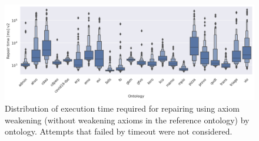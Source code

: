 \begin{figure}[ht]
  \centering
  \includegraphics[width=\textwidth]{resources/time-enhance-ontology-violin.png}
  \caption{Distribution of execution time required for repairing using axiom weakening (without weakening axioms in the reference ontology) by ontology. Attempts that failed by timeout were not considered.}
\end{figure}

